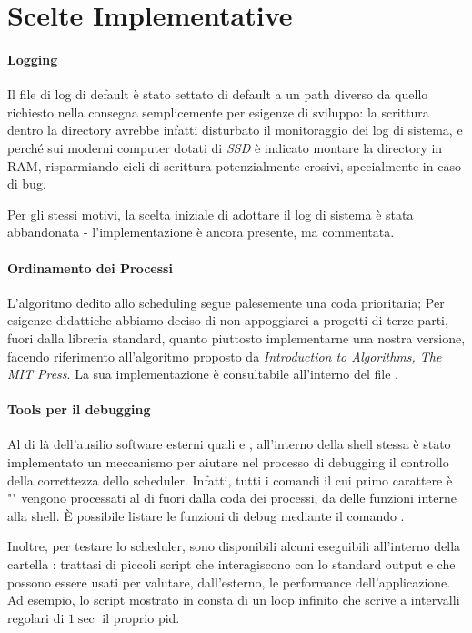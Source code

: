 \documentclass[11pt]{article}
\begin{document}
\section{Scelte Implementative}

\paragraph{Logging\\}
Il file di log di default \`e stato settato di default a un path diverso da
quello richiesto nella consegna semplicemente per esigenze di sviluppo: la
scrittura dentro la directory  avrebbe infatti disturbato il
monitoraggio dei log di sistema, e perch\'e sui moderni computer dotati di
\emph{SSD} \`e indicato montare la directory  in RAM, risparmiando
cicli di scrittura potenzialmente erosivi, specialmente in caso di bug.

Per gli stessi motivi, la scelta iniziale di adottare il log di sistema
 \`e stata abbandonata - l'implementazione \`e ancora presente, ma
commentata.

\paragraph{Ordinamento dei Processi\\}
L'algoritmo dedito allo scheduling segue palesemente una coda prioritaria;
Per esigenze didattiche abbiamo deciso di non appoggiarci a progetti di terze
parti, fuori dalla libreria standard, quanto piuttosto implementarne una nostra versione,
facendo riferimento all'algoritmo proposto da \emph{Introduction to Algorithms, The MIT Press}.
La sua implementazione \`e consultabile all'interno del file .

\paragraph{Tools per il debugging\\}
Al di l\`a dell'ausilio software esterni quali  e ,
all'interno della shell stessa \`e stato implementato un meccanismo per aiutare
nel processo di debugging il controllo della correttezza dello scheduler.
Infatti, tutti i comandi il cui primo carattere \`e "\code{\%}" vengono processati
al di fuori dalla coda dei processi, da delle funzioni interne alla shell.
\`E possibile listare le funzioni di debug mediante il comando .

Inoltre, per testare lo scheduler, sono disponibili alcuni eseguibili all'interno della
cartella : trattasi di piccoli script che interagiscono con lo standard
output e che possono essere usati per valutare, dall'esterno, le performance dell'applicazione.
Ad esempio, lo script  mostrato in  consta di un
loop infinito che scrive a intervalli regolari di $1\sec$ il proprio pid.
\end{document}
